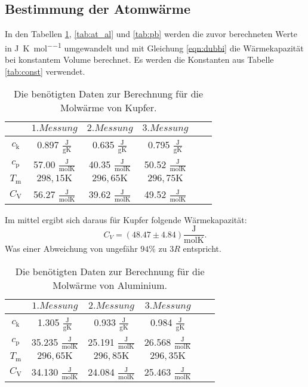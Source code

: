 \subsection{Bestimmung der Atomwärme}
In den Tabellen \ref{tab:at_ku}, \ref{tab:at_al} und \ref{tab:pb} werden die zuvor berechneten Werte in \si{\joule\per\kelvin\per\mol} umgewandelt und mit Gleichung \eqref{eqn:dubbi} die Wärmekapazität bei konstantem Volume berechnet.
Es werden die Konstanten aus Tabelle \ref{tab:const} verwendet.
\begin{table}[H]
	\centering
	\caption{Die benötigten Daten zur Berechnung für die Molwärme von Kupfer.}
	\label{tab:at_ku}
	\begin{tabular}{c c c c c c}
	\toprule
	$ $ & $1.Messung$ & $2. Messung$ & $3. Messung$ \\
	\midrule
	$c_{\text{k}}$ & 0.897 $\frac{\text{J}}{\text{gK}}$ & 0.635 $\frac{\text{J}}{\text{gK}}$ & 0.795 $\frac{\text{J}}{\text{gK}}$ \\
	$c_{\text{p}}$ & 57.00 $\frac{\si{\joule}}{\si{\mol \kelvin}}$ & 40.35 $\frac{\si{\joule}}{\si{\mol \kelvin}}$ & 50.52 $\frac{\si{\joule}}{\si{\mol \kelvin}}$ \\
	$T_{\text{m}}$ & $298,15 \si{\kelvin}$ & $296,65 \si{\kelvin}$ & $296,75 \si{\kelvin}$ \\
	\midrule
	$C_{\text{V}}$ & 56.27 $\frac{\si{\joule}}{\si{\mol \kelvin}}$ &  39.62 $\frac{\si{\joule}}{\si{\mol \kelvin}}$ &  49.52 $\frac{\si{\joule}}{\si{\mol \kelvin}}$ \\
	\bottomrule
	\end{tabular}
\end{table}
Im mittel ergibt sich daraus für Kupfer folgende Wärmekapazität:
\begin{equation*}
	C_V=(48.47 \pm 4.84)\frac{\si{\joule}}{\si{\mol \kelvin}}.
\end{equation*}
Was einer Abweichung von ungefähr $94\%$ zu $3R$ entspricht.
\begin{table}[H]
	\centering
	\caption{Die benötigten Daten zur Berechnung für die Molwärme von Aluminium.}
	\label{tab:at_alu}
	\begin{tabular}{c c c c c c}
	\toprule
	$ $ & $1.Messung$ & $2. Messung$ & $3. Messung$ \\
	\midrule
	$c_{\text{k}}$ & 1.305 $\frac{\text{J}}{\text{gK}}$ & 0.933 $\frac{\text{J}}{\text{gK}}$ & 0.984 $\frac{\text{J}}{\text{gK}}$ \\
	$c_{\text{p}}$ & 35.235 $\frac{\si{\joule}}{\si{\mol \kelvin}}$ & 25.191 $\frac{\si{\joule}}{\si{\mol \kelvin}}$ & 26.568 $\frac{\si{\joule}}{\si{\mol \kelvin}}$ \\
	$T_{\text{m}}$ & $296,65 \si{\kelvin}$ & $296,85 \si{\kelvin}$ & $296,35 \si{\kelvin}$ \\
	\midrule
	$C_{\text{V}}$ & 34.130 $\frac{\si{\joule}}{\si{\mol \kelvin}}$ &  24.084 $\frac{\si{\joule}}{\si{\mol \kelvin}}$ &  25.463 $\frac{\si{\joule}}{\si{\mol \kelvin}}$ \\
	\bottomrule
	\end{tabular}
\end{table}
